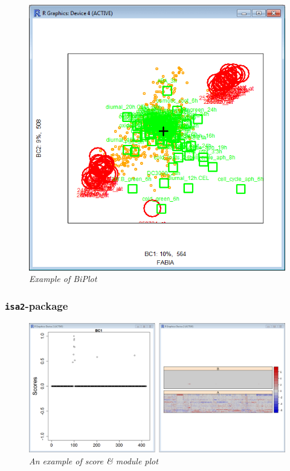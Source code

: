 \documentclass[a4paper]{article}\usepackage[]{graphicx}\usepackage[]{color}
\begin{document}
\begin{figure}[H]
\centering
\includegraphics[scale=0.4]{figures/fabiaplot_example5.png}
\caption{{\it Example of BiPlot}\label{fabiaplot_example5}}
\end{figure}

\subsubsection{\texttt{isa2}-package}
\begin{figure}[H]
\centering
\includegraphics[scale=0.3]{figures/isa_example1.png}
\caption{{\it An example of score \& module plot}\label{isa_example1}}
\end{figure}
\end{document}
